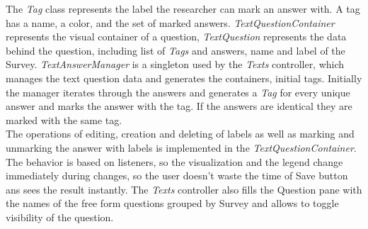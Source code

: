 The \textit{Tag} class represents the label the researcher can mark an answer with. A tag has a name, a color, and the set of marked answers. \textit{TextQuestionContainer} represents the visual container of a question, \textit{TextQuestion} represents the data behind the question, including list of \textit{Tags} and answers, name and label of the Survey. \textit{TextAnswerManager} is a singleton used by the \textit{Texts} controller, which manages the text question data and generates the containers, initial tags. Initially the manager iterates through the answers and generates a \textit{Tag} for every unique answer and marks the answer with the tag. If the answers are identical they are marked with the same tag.\\

The operations of editing, creation and deleting of labels as well as marking and unmarking the answer with labels is implemented in the \textit{TextQuestionContainer}. The behavior is based on listeners, so the visualization and the legend change immediately during changes, so the user doesn't waste the time of Save button ans sees the result instantly. The \textit{Texts} controller also fills the Question pane with the names of the free form questions grouped by Survey and allows to toggle visibility of the question.\\




